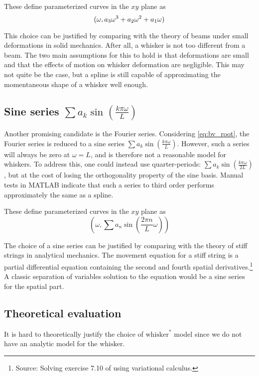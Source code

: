 These define parameterized curves in the $xy$ plane as
\begin{equation}
  (\omega,a_3\omega^3 + a_2\omega^2 + a_1\omega)
\end{equation}

This choice can be justified by comparing with the theory of beams
under small deformations in solid mechanics. After all, a whisker is
not too different from a beam. The two main assumptions for this to
hold is that deformations are small and that the effects of motion on
whisker deformation are negligible. \cite{Hallfasthet} This may not
quite be the case, but a spline is still capable of approximating the
momentaneous shape of a whisker well enough.

\subsection{Sine series $\sum a_k\sin \left(\frac{k\pi\omega}{L}\right)$}
Another promising candidate is the Fourier series. Considering
\eqref{eq:bv_root}, the Fourier series is reduced to a sine series
$\sum a_k\sin \left(\frac{k\pi\omega}{L}\right)$. However, such a
series will always be zero at $\omega = L$, and is therefore not a
reasonable model for whiskers. To address this, one could instead use
quarter-periods: $\sum a_k \sin\left( \frac{k\pi\omega}{2L}\right)$,
but at the cost of losing the orthogonality property of the sine
basis. Manual tests in MATLAB indicate that such a series to third
order performs approximately the same as a spline.

These define parameterized curves in the $xy$ plane as
\begin{equation}
    (\omega,\sum{a_n\sin (\frac{2\pi n}{L}\omega)})
\end{equation}


The choice of a sine series can be justified by comparing with the
theory of stiff strings in analytical mechanics. The movement equation
for a stiff string is a partial differential equation containing the
second and fourth spatial derivatives.\footnote{Source: Solving
  exercise 7.10 of \cite{VarKalk} using variational calculus.} A
classic separation of variables solution to the equation would be a
sine series for the spatial part.

\subsection{Theoretical evaluation}

It is hard to theoretically justify the choice of $\text{whisker}^*$
model since we do not have an analytic model for the $\text{whisker}$.

